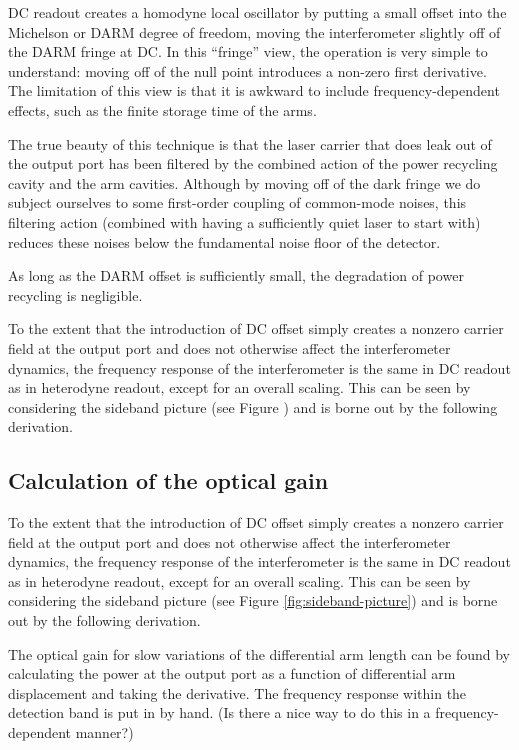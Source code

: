 
DC readout creates a homodyne local oscillator by putting a small
offset into the Michelson or DARM degree of freedom, moving the
interferometer slightly off of the DARM fringe at DC.  In this
``fringe'' view, the operation is very simple to understand: moving
off of the null point introduces a non-zero first derivative.  The
limitation of this view is that it is awkward to include
frequency-dependent effects, such as the finite storage time of the
arms.

The true beauty of this technique is that the laser carrier that does
leak out of the output port has been filtered by the combined action of
the power recycling cavity and the arm cavities.  Although by moving
off of the dark fringe we do subject ourselves to some first-order
coupling of common-mode noises, this filtering action (combined with
having a sufficiently quiet laser to start with) reduces these noises
below the fundamental noise floor of the detector.  

As long as the DARM offset is sufficiently small, the degradation of
power recycling is negligible.


To the extent that the introduction of DC offset simply creates a
nonzero carrier field at the output port and does not otherwise affect
the interferometer dynamics, the frequency response of the
interferometer is the same in DC readout as in heterodyne readout,
except for an overall scaling. This can be seen by considering the
sideband picture (see Figure ) and is borne out
by the following derivation.



\subsection{Calculation of the optical gain}

To the extent that the introduction of DC offset simply creates a
nonzero carrier field at the output port and does not otherwise affect
the interferometer dynamics, the frequency response of the interferometer
is the same in DC readout as in heterodyne readout, except for an
overall scaling. This can be seen by considering the sideband picture
(see Figure \ref{fig:sideband-picture}) and is borne out by the following
derivation.%

The optical gain for slow variations of the differential arm length
can be found by calculating the power at the output port as a function
of differential arm displacement and taking the derivative. The frequency
response within the detection band is put in by hand. (Is there a
nice way to do this in a frequency-dependent manner?)

